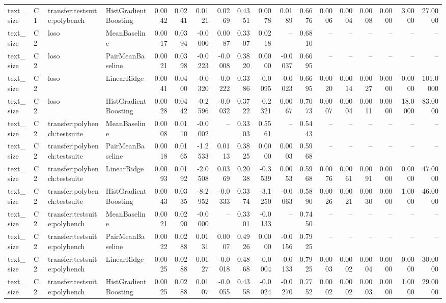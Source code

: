 \begin{table}[t]
\begin{tabular}{llllrrrrrrrrrrrrrr}
text\_size & C1 & transfer:testsuite:polybench & HistGradientBoosting & 0.0042 & 0.0241 & 0.0121 & 0.0269 & 0.4351 & 0.0078 & 0.0189 & 0.6676 & 0.0006 & 0.0004 & 0.0008 & 0.0000 & 3.0000 & 27.0000 \\
text\_size & C2 & loso & MeanBaseline & 0.0017 & 0.0394 & -0.0000 & 0.0087 & 0.3307 & 0.0218 & -- & 0.6810 & -- & -- & -- & -- & -- & -- \\
text\_size & C2 & loso & PairMeanBaseline & 0.0021 & 0.0398 & -0.0223 & -0.0008 & 0.3820 & 0.0000 & -0.0037 & 0.6695 & -- & -- & -- & -- & -- & -- \\
text\_size & C2 & loso & LinearRidge & 0.0041 & 0.0400 & -0.0320 & -0.0222 & 0.3386 & -0.0095 & -0.0023 & 0.6695 & 0.0020 & 0.0014 & 0.0027 & 0.0000 & 0.0000 & 101.0000 \\
text\_size & C2 & loso & HistGradientBoosting & 0.0028 & 0.0442 & -0.2596 & -0.0032 & 0.3722 & -0.2321 & 0.0067 & 0.7073 & 0.0007 & 0.0004 & 0.0011 & 0.0000 & 18.0000 & 83.0000 \\
text\_size & C2 & transfer:polybench:testsuite & MeanBaseline & 0.0008 & 0.0110 & -0.0002 & -- & 0.3303 & 0.5561 & -- & 0.5443 & -- & -- & -- & -- & -- & -- \\
text\_size & C2 & transfer:polybench:testsuite & PairMeanBaseline & 0.0018 & 0.0165 & -1.2533 & 0.0113 & 0.3825 & 0.0000 & 0.0003 & 0.5968 & -- & -- & -- & -- & -- & -- \\
text\_size & C2 & transfer:polybench:testsuite & LinearRidge & 0.0093 & 0.0192 & -2.0508 & 0.0369 & 0.2038 & -0.3539 & 0.0053 & 0.5968 & 0.0076 & 0.0061 & 0.0091 & 0.0000 & 0.0000 & 47.0000 \\
text\_size & C2 & transfer:polybench:testsuite & HistGradientBoosting & 0.0043 & 0.0335 & -8.2952 & -0.0333 & 0.3374 & -3.1250 & -0.0063 & 0.5890 & 0.0026 & 0.0021 & 0.0030 & 0.0000 & 1.0000 & 46.0000 \\
text\_size & C2 & transfer:testsuite:polybench & MeanBaseline & 0.0021 & 0.0290 & -0.0000 & -- & 0.3301 & -0.0133 & -- & 0.7450 & -- & -- & -- & -- & -- & -- \\
text\_size & C2 & transfer:testsuite:polybench & PairMeanBaseline & 0.0022 & 0.0288 & 0.0131 & 0.0007 & 0.4926 & 0.0000 & -0.0156 & 0.7925 & -- & -- & -- & -- & -- & -- \\
text\_size & C2 & transfer:testsuite:polybench & LinearRidge & 0.0025 & 0.0288 & 0.0127 & -0.0018 & 0.4868 & -0.0004 & -0.0133 & 0.7925 & 0.0003 & 0.0002 & 0.0004 & 0.0000 & 0.0000 & 30.0000 \\
text\_size & C2 & transfer:testsuite:polybench & HistGradientBoosting & 0.0025 & 0.0288 & 0.0107 & -0.0055 & 0.4358 & -0.0024 & -0.0270 & 0.7752 & 0.0002 & 0.0002 & 0.0003 & 0.0000 & 1.0000 & 29.0000 \\
\bottomrule
\end{tabular}
\end{table}
